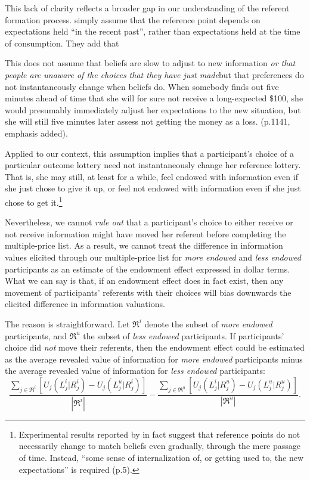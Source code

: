 This lack of clarity reflects a broader gap in our understanding of the referent formation process. \citet{koszegiModelReferenceDependentPreferences2006} simply assume that the reference point depends on expectations held \enquote{in the recent past}, rather than expectations held at the time of consumption. They add that
\begin{displayquote}
  This does not assume that beliefs are slow to adjust to new information \emph{or that people are unaware of the choices that they have just made}\textemdash but that preferences do not instantaneously change when beliefs do. When somebody finds out five minutes ahead of time that she will for sure not receive a long-expected \$100, she would presumably immediately adjust her expectations to the new situation, but she will still five minutes later assess not getting the money as a loss. (p.1141, emphasis added).
\end{displayquote}

Applied to our context, this assumption implies that a participant’s choice of a particular outcome lottery need not instantaneously change her reference lottery. That is, she may still, at least for a while, feel endowed with information even if she just chose to give it up, or feel not endowed with information even if she just chose to get it.\footnote{Experimental results reported by \citet{heffetzAreReferencePoints2018} in fact suggest that reference points do not necessarily change to match beliefs even gradually, through the mere passage of time.  Instead, \enquote{some sense of internalization of, or getting used to, the new expectations} is required (p.5).}

Nevertheless, we cannot \emph{rule out} that a participant's choice to either receive or not receive information might have moved her referent before completing the multiple-price list. As a result, we cannot treat the difference in information values elicited through our multiple-price list for \emph{more endowed} and \emph{less endowed} participants as an estimate of the endowment effect expressed in dollar terms. What we can say is that, if an endowment effect does in fact exist, then any movement of participants' referents with their choices will bias downwards the elicited difference in information valuations.

The reason is straightforward. Let $\Re^i$ denote the subset of \emph{more endowed} participants, and $\Re^u$ the subset of \emph{less endowed} participants. If participants' choice did \emph{not} move their referents, then the endowment effect could be estimated as the average revealed value of information for \emph{more endowed} participants minus the average revealed value of information for \emph{less endowed} participants:
\begin{equation*}
  \frac{\sum_{j \in \Re^i}[U_j(L_j^i|R_j^i)-U_j(L_j^u|R_j^i)]}
       {|\Re^i|}
  -
  \frac{\sum_{j \in \Re^u}[U_j(L_j^i|R_j^u)-U_j(L_j^u|R_j^u)]}
      {|\Re^u|}.
\end{equation*}

